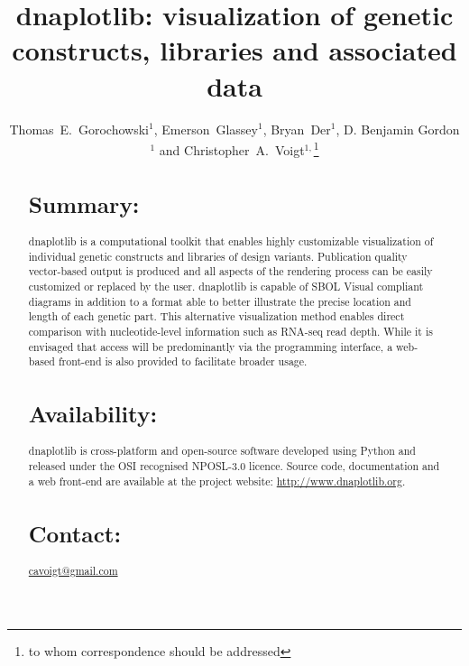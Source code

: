 \documentclass{bioinfo}
\begin{document}

\title[dnaplotlib]{dnaplotlib: visualization of genetic constructs, libraries and associated data}
\author[Thomas E. Gorochowski \textit{et~al.}]{Thomas~E.~Gorochowski$^{1}$, Emerson~Glassey$^{1}$, Bryan~Der$^{1}$, D. Benjamin Gordon$^{1}$ and Christopher~A.~Voigt$^{1,}$\footnote{to whom correspondence should be addressed}}
\address{$^{1}$Department of Biological Engineering, Synthetic Biology Center, Massachusetts Institute of Technology, USA.}



\maketitle

\begin{abstract}

\section{Summary:}
dnaplotlib is a computational toolkit that enables highly customizable visualization of individual genetic constructs and libraries of design variants. Publication quality vector-based output is produced and all aspects of the rendering process can be easily customized or replaced by the user. dnaplotlib is capable of SBOL Visual compliant diagrams in addition to a format able to better illustrate the precise location and length of each genetic part. This alternative visualization method enables direct comparison with nucleotide-level information such as RNA-seq read depth. While it is envisaged that access will be predominantly via the programming interface, a web-based front-end is also provided to facilitate broader usage.

\section{Availability:}
dnaplotlib is cross-platform and open-source software developed using Python and released under the OSI recognised NPOSL-3.0 licence. Source code, documentation and a web front-end are available at the project website: \href{http://www.dnaplotlib.org}{http://www.dnaplotlib.org}.

\section{Contact:} \href{cavoigt@gmail.com}{cavoigt@gmail.com}
\end{abstract}
\end{document}
